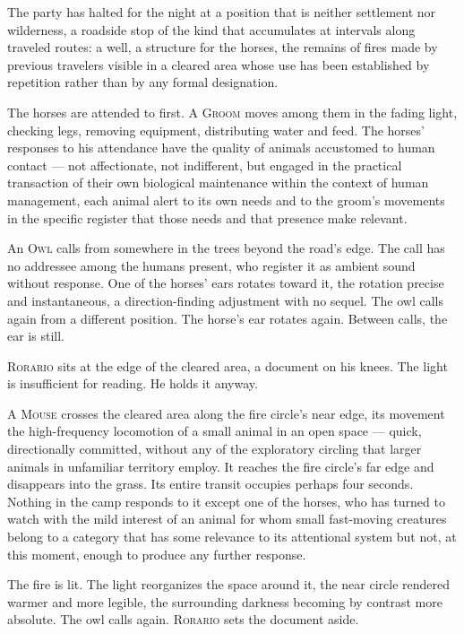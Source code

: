 \documentclass[12pt, oneside]{article}
\newcommand{\sceneheading}[1]{%
  \vspace{1.8em}%
  \noindent{\bfseries\large\MakeUppercase{#1}}%
  \vspace{0.6em}%
  \par\noindent{\color{rulecolor}\rule{\linewidth}{0.3pt}}%
  \vspace{0.5em}\par%
}
\newenvironment{action}{%
  \vspace{0.6em}%
  \noindent\ignorespaces%
}{%
  \par\vspace{0.6em}%
}
\begin{document}
\sceneheading{EXT. Roadside — Dusk}

\begin{action}
The party has halted for the night at a position that is neither settlement nor wilderness, a roadside stop of the kind that accumulates at intervals along traveled routes: a well, a structure for the horses, the remains of fires made by previous travelers visible in a cleared area whose use has been established by repetition rather than by any formal designation.

The horses are attended to first. A \textsc{Groom} moves among them in the fading light, checking legs, removing equipment, distributing water and feed. The horses' responses to his attendance have the quality of animals accustomed to human contact --- not affectionate, not indifferent, but engaged in the practical transaction of their own biological maintenance within the context of human management, each animal alert to its own needs and to the groom's movements in the specific register that those needs and that presence make relevant.

An \textsc{Owl} calls from somewhere in the trees beyond the road's edge. The call has no addressee among the humans present, who register it as ambient sound without response. One of the horses' ears rotates toward it, the rotation precise and instantaneous, a direction-finding adjustment with no sequel. The owl calls again from a different position. The horse's ear rotates again. Between calls, the ear is still.

\textsc{Rorario} sits at the edge of the cleared area, a document on his knees. The light is insufficient for reading. He holds it anyway.

A \textsc{Mouse} crosses the cleared area along the fire circle's near edge, its movement the high-frequency locomotion of a small animal in an open space --- quick, directionally committed, without any of the exploratory circling that larger animals in unfamiliar territory employ. It reaches the fire circle's far edge and disappears into the grass. Its entire transit occupies perhaps four seconds. Nothing in the camp responds to it except one of the horses, who has turned to watch with the mild interest of an animal for whom small fast-moving creatures belong to a category that has some relevance to its attentional system but not, at this moment, enough to produce any further response.

The fire is lit. The light reorganizes the space around it, the near circle rendered warmer and more legible, the surrounding darkness becoming by contrast more absolute. The owl calls again. \textsc{Rorario} sets the document aside.
\end{action}
\end{document}
